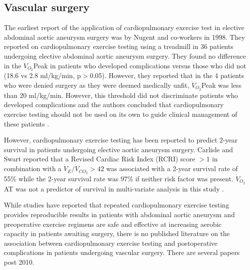 \subsection{Vascular surgery}
The earliest report of the application of cardiopulmonary exercise test in elective abdominal aortic aneurysm surgery was by Nugent and co-workers in 1998. 
They reported on cardiopulmonary exercise testing using a treadmill in 36 patients undergoing elective abdominal aortic aneurysm surgery. 
They found no difference in the $\dot{V}_{O_2}$Peak in patients who developed complications versus those who did not (18.6 vs 2.8 ml/kg/min, p$>$0.05). 
However, they reported that in the 4 patients who were denied surgery as they were deemed medically unfit, $\dot{V}_{O_2}$Peak was less than 20 ml/kg/min. 
However, this threshold did not discriminate patients who developed complications and the authors concluded that cardiopulmonary exercise testing should not be used on its own to guide clinical management of these patients \parencite{nugent_cardiopulmonary_1998}. 

However, cardiopulmonary exercise testing has been reported to predict 2-year survival in patients undergoing elective aortic aneurysm surgery. 
Carlisle and Swart reported that a Revised Cardiac Risk Index (RCRI) score $>1$ in combination with a $\dot{V}_E/\dot{V}_{CO_2}>42$ was associated with a 2-year survival rate of 55\% while the 2-year survival rate was 97\% if neither risk factor was present. $\dot{V}_{O_2}$AT was not a predictor of survival in multi-variate analysis in this study \parencite{carlisle_mid-term_2007}. 

While studies have reported that repeated cardiopulmonary exercise testing provides reproducible results in patients with abdominal aortic aneurysm and preoperative exercise regimens are safe and effective at increasing aerobic capacity in patients awaiting surgery, there is no published literature on the association between cardiopulmonary exercise testing and postoperative complications in patients undergoing vascular surgery. %
There are several papers post 2010. 

